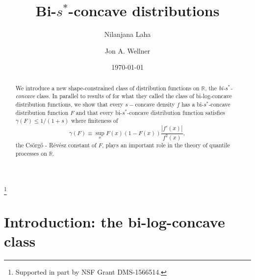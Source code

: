\documentclass[11pt]{amsart}
\numberwithin{equation}{section}
\newcommand{\RR}{\mathbb{R}}
\theoremstyle{definition}\newtheorem{definition}{Definition}
\theoremstyle{remark}\newtheorem{assumption}{Assumption}
\theoremstyle{remark}\newtheorem{remark}{Remark}
\theoremstyle{definition}\newtheorem{example}{Example}
\theoremstyle{plain}\newtheorem{question}{Question}
\theoremstyle{plain}\newtheorem{theorem}{Theorem}
\theoremstyle{plain}\newtheorem{lemma}{Lemma}
\theoremstyle{plain}\newtheorem{proposition}{Proposition}
\theoremstyle{plain}\newtheorem{corollary}{Corollary}
\theoremstyle{plain}\newtheorem{conjecture}{Conjecture}
\begin{document}
	
%	

%


\title{Bi-$s^*$-concave distributions} %

\author[N. Laha]{Nilanjana Laha}
\address[N. Laha]{
Department of Statistics, Box 354322, University of Washington, Seattle, WA 98195-4322, USA.
}

\author[J. A. Wellner]{Jon A. Wellner}
\address[J. A. Wellner]{
Department of Statistics, Box 354322, University of Washington, Seattle, WA 98195-4322, USA.
}


\thanks{Supported in part by NSF Grant DMS-1566514. }

\date{\today}

\maketitle


\begin{abstract}
We introduce a new shape-constrained class of distribution 
functions on $\RR$, the {\sl bi-$s^*$-concave} class.   In parallel to 
results of \cite{DuembgenKW:2017}  %
for what they called the class of bi-log-concave distribution functions,
we show that every $s-$concave density $f$ has a bi-$s^*$-concave 
distribution function $F$ and that every bi-$s^*$-concave distribution function 
satisfies $\gamma (F) \le  1/(1+s)$  where finiteness of
$$
\gamma (F) \equiv \sup_{x} F(x) (1-F(x)) \frac{| f' (x)|}{f^2 (x)},
$$
 the Cs\"org\H{o} - R\'ev\'esz constant of $F$, plays an important role in the 
 theory of quantile processes on $\RR$. 
\end{abstract}


\tableofcontents

\section{Introduction:  the bi-log-concave class}
\label{sec:intro}
\end{document}
